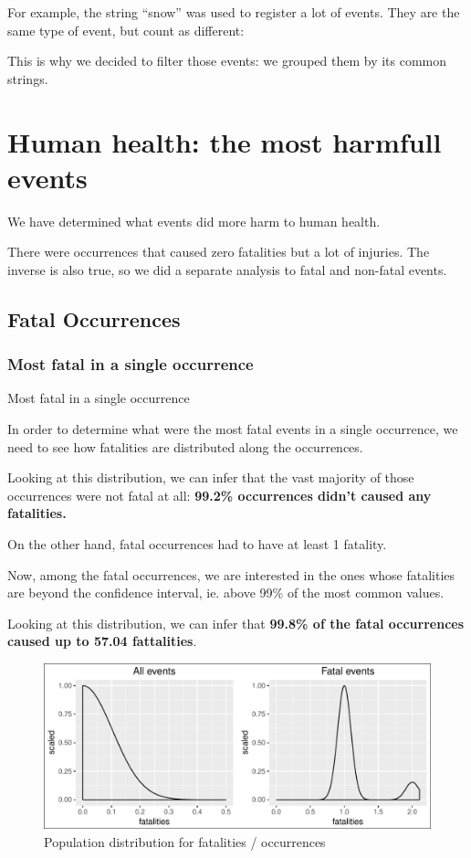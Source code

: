 \documentclass[]{article}
\begin{document}
For example, the string ``snow'' was used to register a lot of events.
They are the same type of event, but count as different:

This is why we decided to filter those events: we grouped them by its
common strings.

\section{Human health: the most harmfull
events}\label{human-health-the-most-harmfull-events}

We have determined what events did more harm to human health.

There were occurrences that caused zero fatalities but a lot of
injuries. The inverse is also true, so we did a separate analysis to
fatal and non-fatal events.

\subsection{Fatal Occurrences}\label{fatal-occurrences}

\subsubsection{Most fatal in a single
occurrence}\label{most-fatal-in-a-single-occurrence}

Most fatal in a single occurrence

In order to determine what were the most fatal events in a single
occurrence, we need to see how fatalities are distributed along the
occurrences.

Looking at this distribution, we can infer that the vast majority of
those occurrences were not fatal at all: \textbf{99.2\% occurrences
didn't caused any fatalities.}

On the other hand, fatal occurrences had to have at least 1 fatality.

Now, among the fatal occurrences, we are interested in the ones whose
fatalities are beyond the confidence interval, ie. above 99\% of the
most common values.

Looking at this distribution, we can infer that \textbf{99.8\% of the
fatal occurrences caused up to 57.04 fattalities}.

\begin{figure}[htbp]
\centering
\includegraphics{readme_files/figure-latex/fatal-distr-4-1.pdf}
\caption{Population distribution for fatalities / occurrences}
\end{figure}
\end{document}
